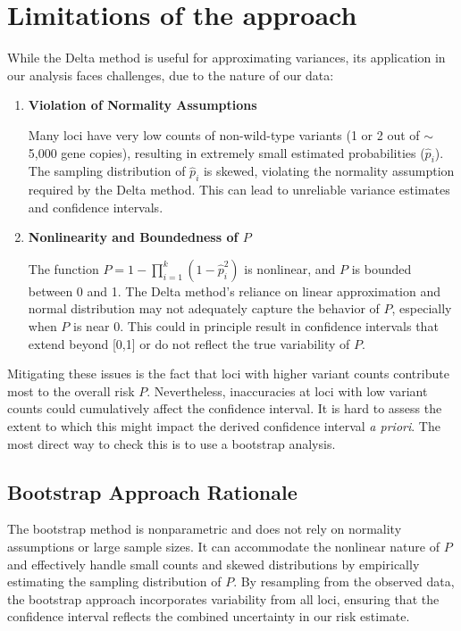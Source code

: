 \documentclass{article}
\begin{document}
\section*{Limitations of the approach}

While the Delta method is useful for approximating variances, its application in our analysis faces challenges, due to the nature of our data:

\begin{enumerate}

\item \textbf{Violation of Normality Assumptions}

Many loci have very low counts of non-wild-type variants (1 or 2 out of \(\sim\)5,000 gene copies), resulting in extremely small estimated probabilities (\( \hat{p}_i \)). The sampling distribution of \( \hat{p}_i \) is skewed, violating the normality assumption required by the Delta method. This can lead to unreliable variance estimates and confidence intervals.

\item \textbf{Nonlinearity and Boundedness of \( P \)}

The function \( P = 1 - \prod_{i=1}^{k} (1 - \hat{p}_i^2) \) is nonlinear, and \( P \) is bounded between 0 and 1. The Delta method's reliance on linear approximation and normal distribution may not adequately capture the behavior of \( P \), especially when \( P \) is near 0. This could in principle result in confidence intervals that extend beyond [0,1] or do not reflect the true variability of \( P \).

\end{enumerate}

Mitigating these issues is the fact that loci with higher variant counts contribute most to the overall risk \( P \). Nevertheless, inaccuracies at loci with low variant counts could cumulatively affect the confidence interval. It is hard to assess the extent to which this might impact the derived confidence interval {\it a priori}. The most direct way to check this is to use a bootstrap analysis.

\subsection*{Bootstrap Approach Rationale}

The bootstrap method is nonparametric and does not rely on normality assumptions or large sample sizes. It can accommodate the nonlinear nature of \( P \) and effectively handle small counts and skewed distributions by empirically estimating the sampling distribution of \( P \). By resampling from the observed data, the bootstrap approach incorporates variability from all loci, ensuring that the confidence interval reflects the combined uncertainty in our risk estimate.
\end{document}
